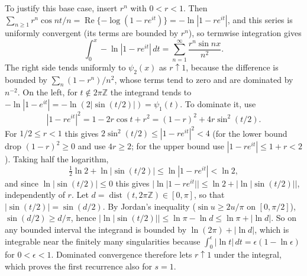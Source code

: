 To justify this base case, insert $r^n$ with $0<r<1$. Then
$\sum_{n\ge1}r^n\cos nt/n=\operatorname{Re}\{-\log(1-re^{it})\}
=-\ln|1-re^{it}|$, and this series is uniformly convergent (its terms
are bounded by $r^n$), so termwise integration gives
\[
\int_0^x-\ln|1-re^{it}|\,dt
=\sum_{n=1}^{\infty}\frac{r^n\sin nx}{n^2}.
\]
The right side tends uniformly to $\psi_2(x)$ as $r\uparrow1$, because
the difference is bounded by $\sum_n(1-r^n)/n^2$, whose terms tend to
zero and are dominated by $n^{-2}$. On the left, for $t\notin2\pi\mathbb Z$
the integrand tends to $-\ln|1-e^{it}|=-\ln(2|\sin(t/2)|)=\psi_1(t)$.
To dominate it, use
\[
|1-re^{it}|^2=1-2r\cos t+r^2=(1-r)^2+4r\sin^2(t/2).
\]
For $1/2\le r<1$ this gives $2\sin^2(t/2)\le|1-re^{it}|^2<4$ (for the
lower bound drop $(1-r)^2\ge0$ and use $4r\ge2$; for the upper bound use
$|1-re^{it}|\le1+r<2$). Taking half the logarithm,
\[
\tfrac12\ln2+\ln|\sin(t/2)|\le\ln|1-re^{it}|<\ln2,
\]
and since $\ln|\sin(t/2)|\le0$ this gives
$|\ln|1-re^{it}||\le\ln2+|\ln|\sin(t/2)||$, independently of $r$. Let
$d=\operatorname{dist}(t,2\pi\mathbb Z)\in[0,\pi]$, so that
$|\sin(t/2)|=\sin(d/2)$. By Jordan's inequality ($\sin u\ge2u/\pi$ on
$[0,\pi/2]$), $\sin(d/2)\ge d/\pi$, hence
$|\ln|\sin(t/2)||\le\ln\pi-\ln d\le\ln\pi+|\ln d|$. So on any bounded
interval the integrand is bounded by $\ln(2\pi)+|\ln d|$, which is
integrable near the finitely many singularities because
$\int_0^\epsilon|\ln t|\,dt=\epsilon(1-\ln\epsilon)$ for $0<\epsilon<1$.
Dominated convergence therefore lets $r\uparrow1$ under the integral,
which proves the first recurrence also for $s=1$.

